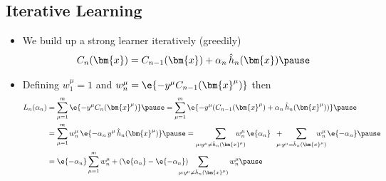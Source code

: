 \begin{slide}
\section[-2]{Iterative Learning}

\begin{PauseHighLight}
  \begin{itemize}
  \item We build up a strong learner iteratively (greedily)
    \begin{align*}
       C_n(\bm{x}) =  C_{n-1}(\bm{x}) + \alpha_n \, \hat{h}_n(\bm{x})\pause
    \end{align*}
  \item Defining $w_1^\mu=1$ and $w_n^\mu = \e{-y^\mu C_{n-1}(\bm{x}^\mu)}$
    then
    \begin{align*}
      L_n(\alpha_n) &= \sum_{\mu=1}^m \e{-y^\mu C_n(\bm{x}^\mu)} \pause
                    = \sum_{\mu=1}^m \e{-y^\mu (C_{n-1}(\bm{x}^{\mu}) +
      \alpha_n \, \hat{h}_n(\bm{x}^\mu))}\pause \\
                    &=
      \sum_{\mu=1}^m w_n^\mu \, \e{-\alpha_n\, y^\mu\, \hat{h}_n(\bm{x}^\mu)}
                      \pause
      =  \sum_{\mu:y^\mu\neq \hat{h}_n(\bm{x}^\mu)}\hspace{-1.5em}  w_n^\mu\,
      \e{\alpha_n} \;\; + \hspace{-1em}
      \sum_{\mu:y^\mu= \hat{h}_n(\bm{x}^\mu)} \hspace{-1.5em} w_n^\mu\, \e{-\alpha_n}\pause
      \\
      &= \e{-\alpha_n} \sum_{\mu=1}^m w_n^\mu  +
        (\e{\alpha_n}-\e{-\alpha_n})\hspace{-1.5em} 
        \sum_{\mu:y^\mu\neq \hat{h}_n(\bm{x}^\mu)} w_n^\mu\pause
    \end{align*}
   \end{itemize}
\end{PauseHighLight}

\end{slide}



